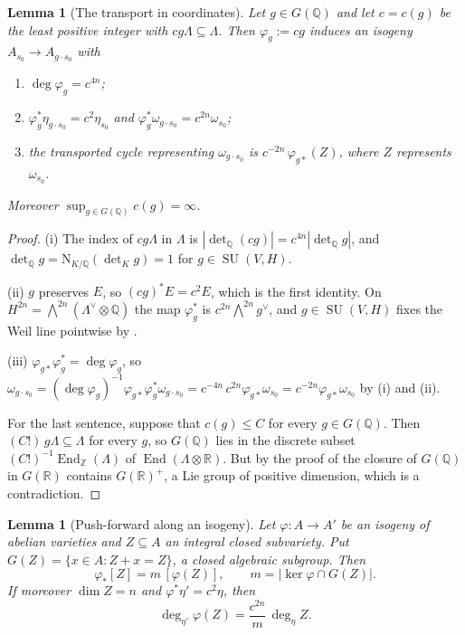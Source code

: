 \documentclass[11pt,reqno]{amsart}
\theoremstyle{plain}
\newtheorem{lemma}[theorem]{Lemma}
\theoremstyle{definition}
\theoremstyle{remark}
\newcommand{\QQ}{\mathbb{Q}}
\newcommand{\ZZ}{\mathbb{Z}}
\newcommand{\RR}{\mathbb{R}}
\newcommand{\Nm}{\mathrm{N}}             %
\DeclareMathOperator{\End}{End}
\DeclareMathOperator{\SU}{SU}
\begin{document}
\begin{lemma}[The transport in coordinates]\label{lem:transport}
Let $g\in G(\QQ)$ and let $c=c(g)$ be the least positive integer with
$cg\Lambda\subseteq\Lambda$. Then $\varphi_{g}:=cg$ induces an isogeny
$A_{s_{0}}\to A_{g\cdot s_{0}}$ with
\begin{enumerate}[label=\textup{(\roman*)},nosep,leftmargin=2.6em]
\item $\deg\varphi_{g}=c^{4n}$;
\item $\varphi_{g}^{*}\eta_{g\cdot s_{0}}=c^{2}\eta_{s_{0}}$ and
  $\varphi_{g}^{*}\omega_{g\cdot s_{0}}=c^{2n}\omega_{s_{0}}$;
\item the transported cycle representing $\omega_{g\cdot s_{0}}$ is
  $c^{-2n}\,\varphi_{g*}(Z)$, where $Z$ represents $\omega_{s_{0}}$.
\end{enumerate}
Moreover $\sup_{g\in G(\QQ)}c(g)=\infty$.
\end{lemma}

\begin{proof}
(i) The index of $cg\Lambda$ in $\Lambda$ is $|\det_{\QQ}(cg)|
=c^{4n}|\det_{\QQ}g|$, and $\det_{\QQ}g=\Nm_{K/\QQ}(\det_{K}g)=1$ for
$g\in\SU(V,H)$.

(ii) $g$ preserves $E$, so $(cg)^{*}E=c^{2}E$, which is the first identity.
On $H^{2n}=\bigwedge^{2n}(\Lambda^{\vee}\otimes\QQ)$ the map
$\varphi_{g}^{*}$ is $c^{2n}\bigwedge^{2n}g^{\vee}$, and $g\in\SU(V,H)$ fixes
the Weil line pointwise by .

(iii) $\varphi_{g*}\varphi_{g}^{*}=\deg\varphi_{g}$, so
$\omega_{g\cdot s_{0}}=(\deg\varphi_{g})^{-1}\varphi_{g*}
\varphi_{g}^{*}\omega_{g\cdot s_{0}}
=c^{-4n}\,c^{2n}\varphi_{g*}\omega_{s_{0}}=c^{-2n}\varphi_{g*}\omega_{s_{0}}$
by (i) and (ii).

For the last sentence, suppose that $c(g)\le C$ for every $g\in G(\QQ)$.
Then $(C!)\,g\Lambda\subseteq\Lambda$ for every $g$, so $G(\QQ)$ lies in the
discrete subset $(C!)^{-1}\End_{\ZZ}(\Lambda)$ of $\End(\Lambda\otimes\RR)$.
But by the proof of  the closure of $G(\QQ)$ in $G(\RR)$
contains $G(\RR)^{+}$, a Lie group of positive dimension, which is a
contradiction.
\end{proof}

\begin{lemma}[Push-forward along an isogeny]
\label{lem:multiplicity}
Let $\varphi\colon A\to A'$ be an isogeny of abelian varieties and $Z\subseteq A$
an integral closed subvariety. Put
$G(Z)=\{x\in A:Z+x=Z\}$, a closed algebraic subgroup. Then
\[
  \varphi_{*}[Z]=m\,[\varphi(Z)],\qquad
  m=\bigl|\ker\varphi\cap G(Z)\bigr| .
\]
If moreover $\dim Z=n$ and $\varphi^{*}\eta'=c^{2}\eta$, then
\[
  \deg_{\eta'}\varphi(Z)=\frac{c^{2n}}{m}\,\deg_{\eta}Z .
\]
\end{lemma}
\end{document}
